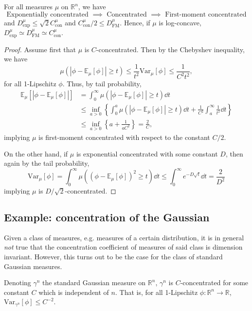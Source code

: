 \begin{proposition}\label{thm:equiv}
  For all measures \(\mu\) on \(\mathbb{R}^n\), we have 
  \[\text{Exponentially concentrated \(\implies\) Concentrated \(\implies\) First-moment concentrated}\]
  and \(D^\mu_{\text{exp}} \le \sqrt{2} C^\mu_{\text{con}}\) and 
  \(C^\mu_{\text{con}} / 2 \le D^\mu_{\text{FM}}\).
  Hence, if \(\mu\) is log-concave, 
  \(D^\mu_{\text{exp}} \simeq D^\mu_{\text{FM}} \simeq C^\mu_{\text{con}}\).
\end{proposition}
\begin{proof}
  Assume first that \(\mu\) is \(C\)-concentrated. Then by the Chebyshev inequality, we have 
  \[\mu(|\phi - \mathbb{E}_\mu[\phi]| \ge t) 
      \le \frac{1}{t^2}\text{Var}_\mu[\phi] 
      \le \frac{1}{C^2t^2},\]
  for all 1-Lipschitz \(\phi\). 
  Thus, by tail probability,
  \begin{align*}\mathbb{E}_\mu[|\phi - \mathbb{E}_\mu[\phi]|] 
    & = \int_0^\infty \mu(|\phi - \mathbb{E}_\mu[\phi]| \ge t) \dd t\\ 
    & \le \inf_{a > 0} \left\{\int_0^a \mu(|\phi - \mathbb{E}_\mu[\phi]| \ge t) \dd t + \frac{1}{C^2} \int_a^\infty \frac{1}{t^2} \dd t\right\}\\ 
    & \le \inf_{a > 0} \left\{a + \frac{1}{aC^2}\right\} = \frac{2}{C},
  \end{align*}
  implying \(\mu\) is first-moment concentrated with respect to the constant \(C / 2\).

  On the other hand, if \(\mu\) is exponential concentrated with some constant \(D\), then 
  again by the tail probability, 
  \[\text{Var}_\mu[\phi] = \int_0^\infty \mu((\phi - \mathbb{E}_\mu[\phi])^2 \ge t) \dd t
      \le \int_0^\infty e^{-D \sqrt{t}} \dd t = \frac{2}{D^2}\]
  implying \(\mu\) is \(D / \sqrt{2}\)-concentrated.
\end{proof}

\subsection{Example: concentration of the Gaussian}

Given a class of measures, e.g. measures of a certain distribution, it is in general \textit{not} true that the concentration coefficient of 
measures of said class is dimension invariant. However, this turns out to be the case for the class of standard Gaussian measures.

\begin{theorem}\label{thm:gaussian_conc}
  Denoting \(\gamma^n\) the standard Gaussian measure on \(\mathbb{R}^n\), \(\gamma^n\) is \(C\)-concentrated 
  for some constant \(C\) which is independent of \(n\). That is, for all 1-Lipschitz 
  \(\phi : \mathbb{R}^n \to \mathbb{R}\), \(\text{Var}_{\gamma^n}[\phi] \le C^{-2}\).
\end{theorem}

